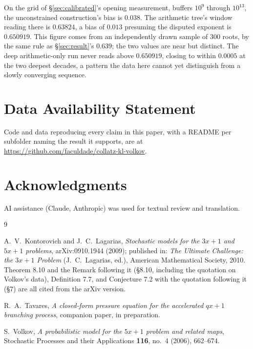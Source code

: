 \documentclass[11pt]{article}
\theoremstyle{remark}
\begin{document}
On the grid of \S\ref{sec:calibrated}'s opening measurement, buffers
$10^9$ through $10^{13}$, the unconstrained construction's bias
is $0.038$. The arithmetic tree's window reading there is $0.63824$, a
bias of $0.013$ presuming the disputed exponent is $0.650919$. This
figure comes from an independently drawn sample of $300$ roots, by the
same rule as \S\ref{sec:result}'s $0.639$; the two values are near but
distinct.
The deep
arithmetic-only run never reads above $0.650919$, closing to within
$0.0005$ at the two deepest decades, a pattern the data here cannot
yet distinguish from a slowly converging sequence.

\section*{Data Availability Statement}

Code and data reproducing every claim in this paper, with a README per
subfolder naming the result it supports, are at
\url{https://github.com/faculdade/collatz-kl-volkov}.

\section*{Acknowledgments}

AI assistance (Claude, Anthropic) was used for textual review and
translation.

\begin{thebibliography}{9}

 A.\ V.\ Kontorovich and J.\ C.\
  Lagarias, \emph{Stochastic models for the $3x+1$ and $5x+1$
  problems}, arXiv:0910.1944 (2009); published in: \emph{The Ultimate
  Challenge: the $3x+1$ Problem} (J.\ C.\ Lagarias, ed.), American
  Mathematical Society, 2010. Theorem 8.10 and the Remark following it
  (\S8.10, including the quotation on Volkov's data), Definition 7.7,
  and Conjecture 7.2 with the quotation following it (\S7) are all
  cited from the arXiv version.

 R.\ A.\ Tavares, \emph{A closed-form
  pressure equation for the accelerated $qx+1$ branching process},
  companion paper, in preparation.

 S.\ Volkov, \emph{A probabilistic model for the
  $5x+1$ problem and related maps}, Stochastic Processes and their
  Applications \textbf{116}, no.\ 4 (2006), 662--674.

\end{thebibliography}
\end{document}
